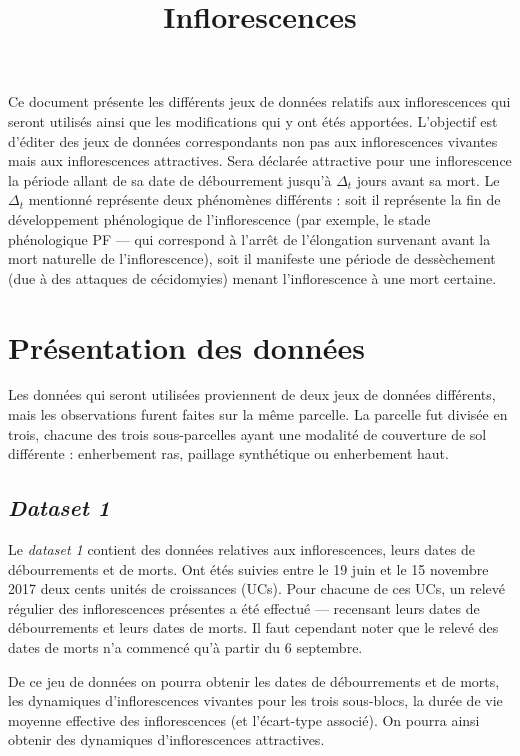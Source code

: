\documentclass[a4paper, 11pt]{article}
\title{Inflorescences}
\author{}
\date{}
\begin{document}
\maketitle

Ce document présente les différents jeux de données relatifs aux inflorescences qui seront utilisés ainsi que les modifications qui y ont étés apportées.
L'objectif est d'éditer des jeux de données correspondants non pas aux inflorescences vivantes mais aux inflorescences attractives. Sera déclarée attractive pour une inflorescence la période allant de sa date de débourrement jusqu'à $\Delta_t$ jours avant sa mort. Le $\Delta_t$ mentionné représente deux phénomènes différents : soit il représente la fin de développement phénologique de l'inflorescence (par exemple, le stade phénologique PF --- qui correspond à l'arrêt de l'élongation survenant avant la mort naturelle de l'inflorescence), soit il manifeste une période de dessèchement (due à des attaques de cécidomyies) menant l'inflorescence à une mort certaine.

\section{Présentation des données}

Les données qui seront utilisées proviennent de deux jeux de données différents, mais les observations furent faites sur la même parcelle. La parcelle fut divisée en trois, chacune des trois sous-parcelles ayant une modalité de couverture de sol différente : enherbement ras, paillage synthétique ou enherbement haut.

\subsection{\textit{Dataset 1}}

Le \textit{dataset 1} contient des données relatives aux inflorescences, leurs dates de débourrements et de morts. Ont étés suivies entre le 19 juin et le 15 novembre 2017 deux cents unités de croissances (UCs). Pour chacune de ces UCs, un relevé régulier des inflorescences présentes a été effectué --- recensant leurs dates de débourrements et leurs dates de morts.
Il faut cependant noter que le relevé des dates de morts n'a commencé qu'à partir du 6 septembre.

De ce jeu de données on pourra obtenir les dates de débourrements et de morts, les dynamiques d'inflorescences vivantes pour les trois sous-blocs, la durée de vie moyenne effective des inflorescences (et l'écart-type associé). On pourra ainsi obtenir des dynamiques d'inflorescences attractives.
\end{document}
